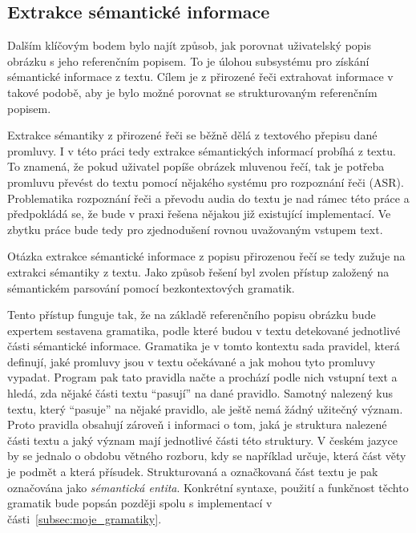 \subsection{Extrakce sémantické informace}
Dalším klíčovým bodem bylo najít způsob, jak porovnat uživatelský popis obrázku s jeho referenčním popisem.
To je úlohou subsystému pro získání sémantické informace z textu.
Cílem je z přirozené řeči extrahovat informace v takové podobě, aby je bylo možné porovnat se strukturovaným referenčním popisem.


Extrakce sémantiky z přirozené řeči se běžně dělá z textového přepisu dané promluvy.
I v této práci tedy extrakce sémantických informací probíhá z textu.
To znamená, že pokud uživatel popíše obrázek mluvenou řečí, tak je potřeba promluvu převést do textu pomocí nějakého systému pro rozpoznání řeči (ASR).
Problematika rozpoznání řeči a převodu audia do textu je nad rámec této práce a předpokládá se, že bude v praxi řešena nějakou již existující implementací.
Ve zbytku práce bude tedy pro zjednodušení rovnou uvažovaným vstupem text.

Otázka extrakce sémantické informace z popisu přirozenou řečí se tedy zužuje na extrakci sémantiky z textu.
Jako způsob řešení byl zvolen přístup založený na sémantickém parsování pomocí bezkontextových gramatik.

Tento přístup funguje tak, že na základě referenčního popisu obrázku bude expertem sestavena gramatika,
podle které budou v textu detekované jednotlivé části sémantické informace.
Gramatika je v tomto kontextu sada pravidel, která definují, jaké promluvy jsou v textu očekávané a jak mohou tyto promluvy vypadat.
Program pak tato pravidla načte a prochází podle nich vstupní text a hledá, zda nějaké části textu \enquote{pasují} na dané pravidlo.
Samotný nalezený kus textu, který \enquote{pasuje} na nějaké pravidlo, ale ještě nemá žádný užitečný význam.
Proto pravidla obsahují zároveň i informaci o tom, jaká je struktura nalezené části textu a jaký význam mají jednotlivé části této struktury.
V českém jazyce by se jednalo o obdobu větného rozboru, kdy se například určuje, která část věty je podmět a která přísudek.
Strukturovaná a označkovaná část textu je pak označována jako \emph{sémantická entita}.
Konkrétní syntaxe, použití a funkčnost těchto gramatik bude popsán později spolu s implementací v části~\ref{subsec:moje_gramatiky}.

